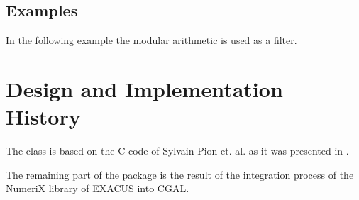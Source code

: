 \subsection{Examples}

In the following example the modular arithmetic is used as a filter. 


\section{Design and Implementation History}

The class  is based on the C-code of Sylvain Pion et. al. 
as it was presented in \cite{bepp-sdrns-99}. 

The remaining part of the package is the result of the integration process
of the NumeriX library of EXACUS \cite{beh+-eeeafcs-05} into CGAL. 

